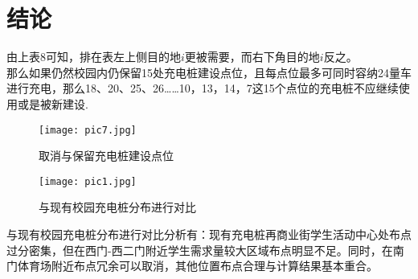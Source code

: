 \section{结论}
由上表8可知，排在表左上侧目的地$i$更被需要，而右下角目的地$i$反之。\\
\indent 那么如果仍然校园内仍保留15处充电桩建设点位，且每点位最多可同时容纳24量车进行充电，那么18、20、25、26……10，13，14，7这15个点位的充电桩不应继续使用或是被新建设.
\begin{figure}[H]
    \centering
    \texttt{[image: pic7.jpg]}
    \caption{取消与保留充电桩建设点位}
\end{figure}
\begin{figure}[H]
    \centering
    \texttt{[image: pic1.jpg]}
    \caption{与现有校园充电桩分布进行对比}
\end{figure}
与现有校园充电桩分布进行对比分析有：现有充电桩再商业街学生活动中心处布点过分密集，但在西门-西二门附近学生需求量较大区域布点明显不足。同时，在南门体育场附近布点冗余可以取消，其他位置布点合理与计算结果基本重合。